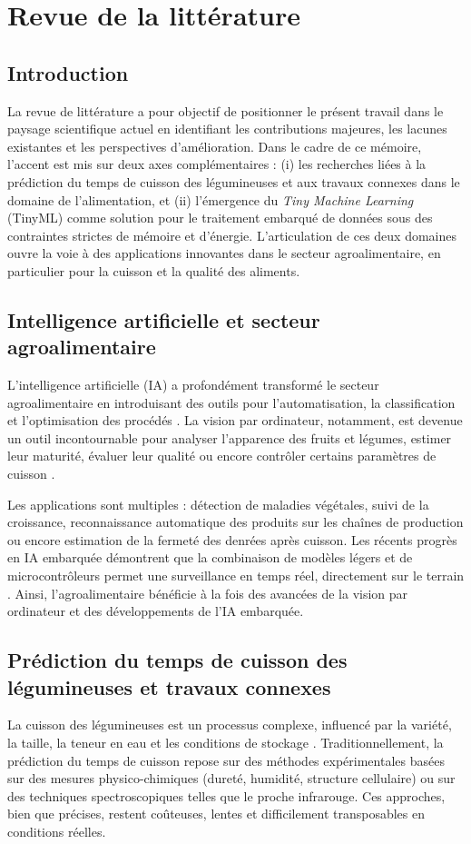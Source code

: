 \chapter{Revue de la littérature}
\label{chap:revue_litterature}

\section{Introduction}
La revue de littérature a pour objectif de positionner le présent travail dans le paysage scientifique actuel en identifiant les contributions majeures, les lacunes existantes et les perspectives d’amélioration. Dans le cadre de ce mémoire, l’accent est mis sur deux axes complémentaires : (i) les recherches liées à la prédiction du temps de cuisson des légumineuses et aux travaux connexes dans le domaine de l’alimentation, et (ii) l’émergence du \textit{Tiny Machine Learning} (TinyML) comme solution pour le traitement embarqué de données sous des contraintes strictes de mémoire et d’énergie. L’articulation de ces deux domaines ouvre la voie à des applications innovantes dans le secteur agroalimentaire, en particulier pour la cuisson et la qualité des aliments.

\section{Intelligence artificielle et secteur agroalimentaire}
L’intelligence artificielle (IA) a profondément transformé le secteur agroalimentaire en introduisant des outils pour l’automatisation, la classification et l’optimisation des procédés \cite{kamilaris2018}. La vision par ordinateur, notamment, est devenue un outil incontournable pour analyser l’apparence des fruits et légumes, estimer leur maturité, évaluer leur qualité ou encore contrôler certains paramètres de cuisson \cite{rahman2020}.

Les applications sont multiples : détection de maladies végétales, suivi de la croissance, reconnaissance automatique des produits sur les chaînes de production ou encore estimation de la fermeté des denrées après cuisson. Les récents progrès en IA embarquée démontrent que la combinaison de modèles légers et de microcontrôleurs permet une surveillance en temps réel, directement sur le terrain \cite{moeketsi2025, kimutaiforster2024}. Ainsi, l’agroalimentaire bénéficie à la fois des avancées de la vision par ordinateur et des développements de l’IA embarquée.

\section{Prédiction du temps de cuisson des légumineuses et travaux connexes}
La cuisson des légumineuses est un processus complexe, influencé par la variété, la taille, la teneur en eau et les conditions de stockage \cite{singh2019, shimelis2020}. Traditionnellement, la prédiction du temps de cuisson repose sur des méthodes expérimentales basées sur des mesures physico-chimiques (dureté, humidité, structure cellulaire) ou sur des techniques spectroscopiques telles que le proche infrarouge. Ces approches, bien que précises, restent coûteuses, lentes et difficilement transposables en conditions réelles.

